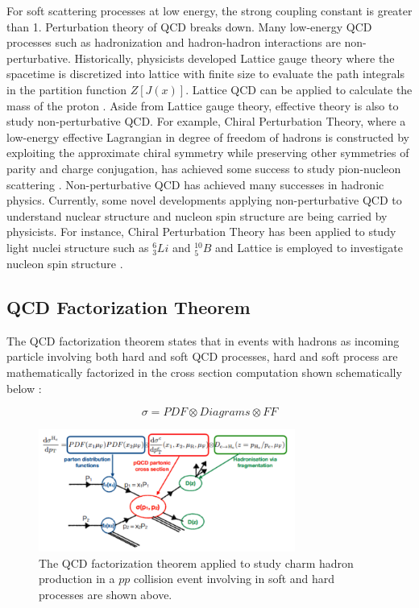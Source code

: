 For soft scattering processes at low energy, the strong coupling constant is greater than 1. Perturbation theory of QCD breaks down. Many low-energy QCD processes such as hadronization and hadron-hadron interactions are non-perturbative. Historically, physicists developed Lattice gauge theory where the spacetime is discretized into lattice with finite size to evaluate the path integrals in the partition function $Z[J(x)]$. Lattice QCD can be applied to calculate the mass of the proton \cite{LQCDProtonMass}. Aside from Lattice gauge theory, effective theory is also to study non-perturbative QCD. For example, Chiral Perturbation Theory, where a low-energy effective Lagrangian in degree of freedom of hadrons is constructed by exploiting the approximate chiral symmetry while preserving other symmetries of parity and charge conjugation, has achieved some success to study pion-nucleon scattering \cite{ChiPT}. Non-perturbative QCD has achieved many successes in hadronic physics. Currently, some novel developments applying non-perturbative QCD to understand nuclear structure and nucleon spin structure are being carried by physicists. For instance, Chiral Perturbation Theory has been applied to study light nuclei structure such as ${}_{3}^{6}Li$ and ${}_{5}^{10}B$ \cite{ChiPTNuclear} and Lattice is employed to investigate nucleon spin structure \cite{LatticeNuclSpin}. 

\subsection{QCD Factorization Theorem}

The QCD factorization theorem states that in events with hadrons as incoming particle involving both hard and soft QCD processes, hard and soft process are mathematically factorized in the cross section computation shown schematically below \cite{QCDFactorization}: 

\begin{equation}
\sigma = PDF \otimes Diagrams \otimes FF
\end{equation}

\begin{figure}[hbtp]
\begin{center}
\includegraphics[width=0.75\textwidth]{Figures/Chapter1/QCDFacNew.png}
\caption{The QCD factorization theorem applied to study charm hadron production in a $pp$ collision event involving in soft and hard processes are shown above.}
\label{QCDFacTheo}
\end{center}
\end{figure} 

